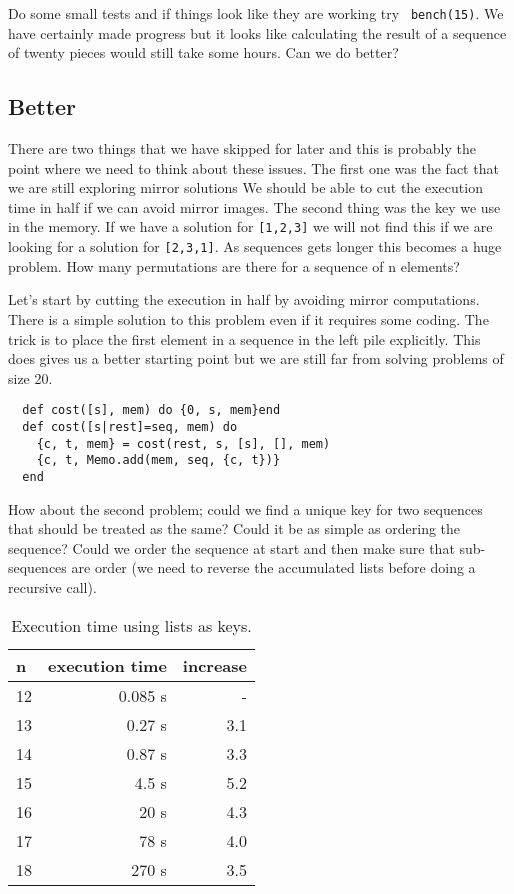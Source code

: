 \documentclass[a4paper,11pt]{article}
\begin{document}
Do some small tests and if things look like they are working try {\tt
  bench(15)}. We have certainly made progress but it looks like
calculating the result of a sequence of twenty pieces would still take
some hours. Can we do better?

\subsection*{Better}

There are two things that we have skipped for later and this is
probably the point where we need to think about these issues. The
first one was the fact that we are still exploring mirror solutions We
should be able to cut the execution time in half if we can avoid
mirror images. The second thing was the key we use in the memory. If
we have a solution for {\tt [1,2,3]} we will not find this if we are
looking for a solution for {\tt [2,3,1]}.  As sequences gets longer
this becomes a huge problem. How many permutations are there for a
sequence of n elements?

Let's start by cutting the execution in half by avoiding mirror
computations. There is a simple solution to this problem even if it
requires some coding. The trick is to place the first element in a
sequence in the left pile explicitly. This does gives us a better
starting point but we are still far from solving problems of size 20.

\begin{verbatim}
  def cost([s], mem) do {0, s, mem}end
  def cost([s|rest]=seq, mem) do
    {c, t, mem} = cost(rest, s, [s], [], mem)
    {c, t, Memo.add(mem, seq, {c, t})}
  end  
\end{verbatim}


How about the second problem; could we find a unique key for two
sequences that should be treated as the same? Could it be as simple as
ordering the sequence? Could we order the sequence at start and then
make sure that sub-sequences are order (we need to reverse the
accumulated lists before doing a recursive call).


\begin{table}[h!]
  \begin{center}
    \begin{tabular}{l|r|r}
      \textbf{n} & \textbf{execution time} & \textbf{increase}\\
      \hline
12	 &0.085 s& - \\ 
13	 &0.27 s&3.1 \\ 
14	 &0.87 s&3.3 \\ 
15	 &4.5 s&5.2 \\ 
16	 &20 s&4.3 \\ 
17	 &78 s&4.0 \\ 
18	 &270 s &3.5 \\ 
    \end{tabular}
    \caption{Execution time using lists as keys.}
  \end{center}
\end{table}
\end{document}
